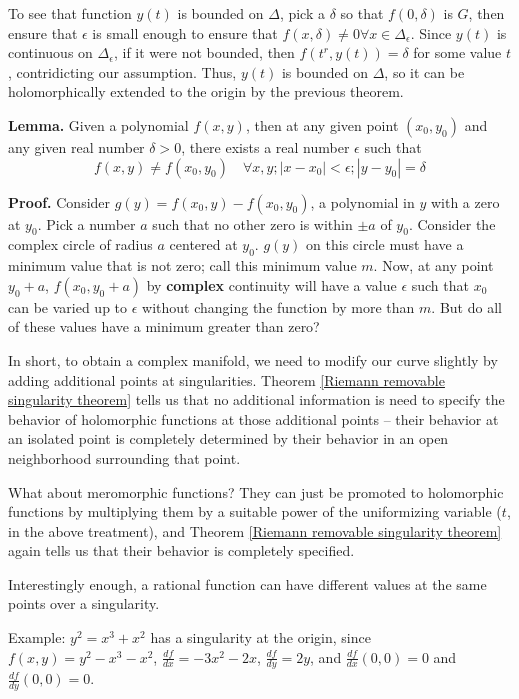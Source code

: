 To see that function $y(t)$ is bounded on $\Delta$, pick a $\delta$ so
that $f(0,\delta)$ is $G$, then ensure that $\epsilon$ is small enough
to ensure that $f(x,\delta) \ne 0 \forall x \in \Delta_\epsilon$.
Since $y(t)$ is continuous on $\Delta_\epsilon$, if it were not
bounded, then $f(t^r,y(t)) = \delta$ for some value $t$, contridicting
our assumption.  Thus, $y(t)$ is bounded on $\Delta$, so it can be
holomorphically extended to the origin by the previous theorem.

{\bf Lemma.}  Given a polynomial $f(x,y)$,
then at any given point $(x_0,y_0)$ and any given real number $\delta>0$,
there exists a real number $\epsilon$ such that
$$f(x,y)\ne f(x_0,y_0) \quad\forall x,y; |x-x_0| < \epsilon; |y-y_0| = \delta$$

{\bf Proof.}  Consider $g(y) = f(x_0,y) - f(x_0,y_0)$, a polynomial in $y$ with
a zero at $y_0$.  Pick a number $a$ such that no other zero is within $\pm a$
of $y_0$.  Consider the complex circle of radius $a$ centered at $y_0$.
$g(y)$ on this circle must have a minimum value that is not zero;
call this minimum value $m$.  Now, at any point $y_0+a$,
$f(x_0, y_0+a)$ by {\bf complex} continuity will have a value $\epsilon$ such that
$x_0$ can be varied up to $\epsilon$ without changing the function by
more than $m$.  But do all of these values have a minimum
greater than zero?

In short, to obtain a complex manifold,
we need to modify our curve slightly by adding additional
points at singularities.
Theorem \ref{Riemann removable singularity theorem}
tells us that no additional information is need to specify
the behavior of holomorphic functions at those additional
points -- their behavior at an isolated point is completely determined by
their behavior in an open neighborhood surrounding that point.

What about meromorphic functions?  They can just be promoted
to holomorphic functions by multiplying them by a suitable
power of the uniformizing variable ($t$, in the above treatment),
and Theorem \ref{Riemann removable singularity theorem} again
tells us that their behavior is completely specified.

Interestingly enough, a rational function can have different values
at the same points over a singularity.

\example
Example: $y^2 = x^3 + x^2$ has a singularity at the origin,
since $f(x,y) = y^2 - x^3 - x^2$, $\frac{df}{dx} = -3x^2-2x$,
$\frac{df}{dy} = 2y$, and $\frac{df}{dx}(0,0) = 0$
and $\frac{df}{dy}(0,0) = 0$.

